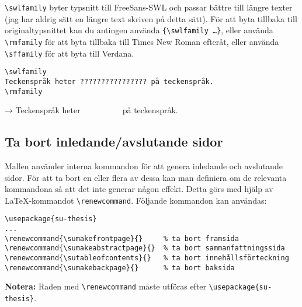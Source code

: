 \medskip

\verb|\swlfamily| byter typsnitt till FreeSans-SWL och passar bättre till
längre texter (jag har aldrig sätt en längre text skriven på detta sätt). För
att byta tillbaka till originaltypsnittet kan du antingen använda
\verb|{\swlfamily …}|, eller använda \verb|\rmfamily| för att byta tillbaka
till Times New Roman efteråt, eller använda \verb|\sffamily| för att byta till
Verdana.

\begin{verbatim}
\swlfamily
Teckenspråk heter ???????????????? på teckenspråk.
\rmfamily
\end{verbatim}

\swlfamily
\hspace{1em}→ Teckenspråk heter 􌥃􌥔􌥘􌥃􌤵􌤷􌥧􌥡􌥼􌥲􌦊􌥱􌦈􌥼􌤟􌥣 på teckenspråk.
\rmfamily


\subsection{Ta bort inledande/avslutande sidor}
\label{genererade}

Mallen använder interna kommandon för att genera inledande och avslutande
sidor. För att ta bort en eller flera av dessa kan man definiera om de
relevanta kommandona så att det inte generar någon effekt. Detta görs med hjälp
av \LaTeX{}-kommandot \verb|\renewcommand|. Följande kommandon kan användas:

\begin{verbatim}
\usepackage{su-thesis}
...
\renewcommand{\sumakefrontpage}{}     % ta bort framsida
\renewcommand{\sumakeabstractpage}{}  % ta bort sammanfattningssida
\renewcommand{\sutableofcontents}{}   % ta bort innehållsförteckning
\renewcommand{\sumakebackpage}{}      % ta bort baksida
\end{verbatim}

\noindent\textbf{Notera:} Raden med \verb|\renewcommand| måste utföras efter
\verb|\usepackage{su-thesis}|.

